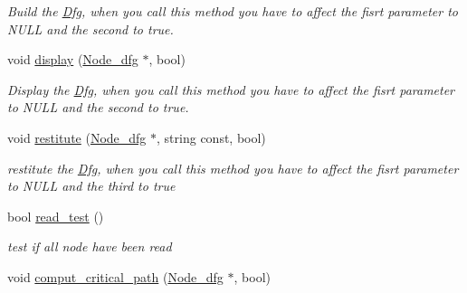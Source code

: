 \begin{DoxyCompactItemize}
\begin{DoxyCompactList}\small\item\em Build the \hyperlink{classDfg}{Dfg}, when you call this method you have to affect the fisrt parameter to NULL and the second to true. \item\end{DoxyCompactList}\item 
\hypertarget{classDfg_a19e39ead57755ba83008c3938c2b4c5d}{
void \hyperlink{classDfg_a19e39ead57755ba83008c3938c2b4c5d}{display} (\hyperlink{classNode__dfg}{Node\_\-dfg} $\ast$, bool)}
\label{classDfg_a19e39ead57755ba83008c3938c2b4c5d}

\begin{DoxyCompactList}\small\item\em Display the \hyperlink{classDfg}{Dfg}, when you call this method you have to affect the fisrt parameter to NULL and the second to true. \item\end{DoxyCompactList}\item 
\hypertarget{classDfg_a2598772fa5761e77dcb975048775602b}{
void \hyperlink{classDfg_a2598772fa5761e77dcb975048775602b}{restitute} (\hyperlink{classNode__dfg}{Node\_\-dfg} $\ast$, string const, bool)}
\label{classDfg_a2598772fa5761e77dcb975048775602b}

\begin{DoxyCompactList}\small\item\em restitute the \hyperlink{classDfg}{Dfg}, when you call this method you have to affect the fisrt parameter to NULL and the third to true \item\end{DoxyCompactList}\item 
\hypertarget{classDfg_a1a6dc2d38709c345177eec0d37ec43e2}{
bool \hyperlink{classDfg_a1a6dc2d38709c345177eec0d37ec43e2}{read\_\-test} ()}
\label{classDfg_a1a6dc2d38709c345177eec0d37ec43e2}

\begin{DoxyCompactList}\small\item\em test if all node have been read \item\end{DoxyCompactList}\item 
\hypertarget{classDfg_ae5d6bbc31290e511657663c1c58ac2ce}{
void \hyperlink{classDfg_ae5d6bbc31290e511657663c1c58ac2ce}{comput\_\-critical\_\-path} (\hyperlink{classNode__dfg}{Node\_\-dfg} $\ast$, bool)}
\label{classDfg_ae5d6bbc31290e511657663c1c58ac2ce}


\end{DoxyCompactItemize}
